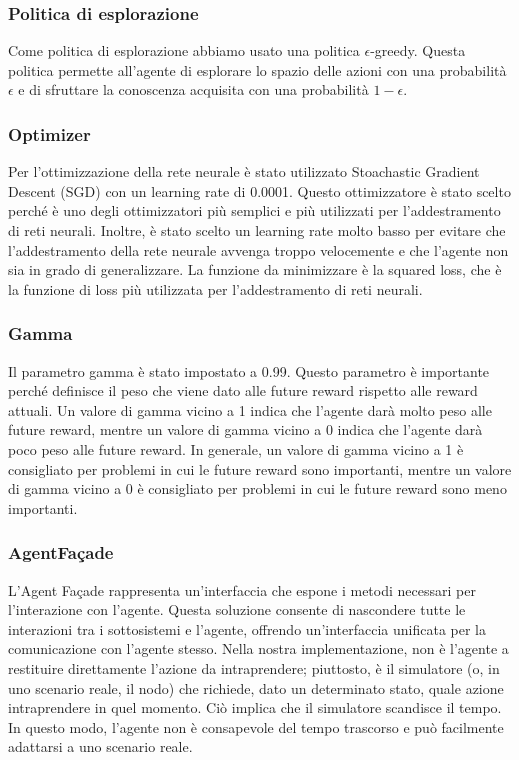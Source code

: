 \documentclass[conference]{IEEEtran}
\begin{document}
\subsubsection{Politica di esplorazione}
Come politica di esplorazione abbiamo usato una politica $\epsilon$-greedy. Questa politica permette all'agente di esplorare lo spazio delle azioni con una probabilità $\epsilon$ e di sfruttare la conoscenza acquisita con una probabilità $1 - \epsilon$. %

\subsubsection{Optimizer}
Per l'ottimizzazione della rete neurale è stato utilizzato Stoachastic Gradient Descent (SGD) con un learning rate di 0.0001. Questo ottimizzatore è stato scelto perché è uno degli ottimizzatori più semplici e più utilizzati per l'addestramento di reti neurali. Inoltre, è stato scelto un learning rate molto basso per evitare che l'addestramento della rete neurale avvenga troppo velocemente e che l'agente non sia in grado di generalizzare. La funzione da minimizzare è la squared loss, che è la funzione di loss più utilizzata per l'addestramento di reti neurali.

\subsubsection{Gamma}
Il parametro gamma è stato impostato a 0.99. Questo parametro è importante perché definisce il peso che viene dato alle future reward rispetto alle reward attuali. Un valore di gamma vicino a 1 indica che l'agente darà molto peso alle future reward, mentre un valore di gamma vicino a 0 indica che l'agente darà poco peso alle future reward. In generale, un valore di gamma vicino a 1 è consigliato per problemi in cui le future reward sono importanti, mentre un valore di gamma vicino a 0 è consigliato per problemi in cui le future reward sono meno importanti.


\subsubsection{AgentFaçade}
L'Agent Façade rappresenta un'interfaccia che espone i metodi necessari per l'interazione con l'agente. Questa soluzione consente di nascondere tutte le interazioni tra i sottosistemi e l'agente, offrendo un'interfaccia unificata per la comunicazione con l'agente stesso. Nella nostra implementazione, non è l'agente a restituire direttamente l'azione da intraprendere; piuttosto, è il simulatore (o, in uno scenario reale, il nodo) che richiede, dato un determinato stato, quale azione intraprendere in quel momento. Ciò implica che il simulatore scandisce il tempo. In questo modo, l'agente non è consapevole del tempo trascorso e può facilmente adattarsi a uno scenario reale.
\end{document}
